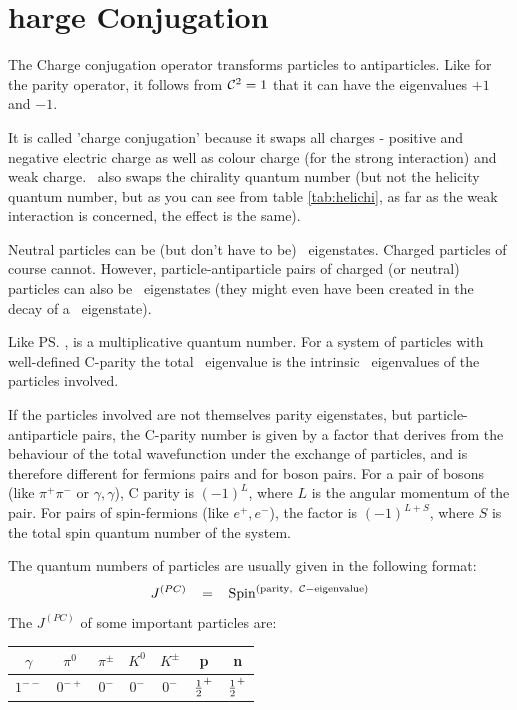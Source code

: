 \section{\cs{}harge Conjugation}
\label{sec:ChargeConjugation}
 The Charge conjugation operator transforms particles to
 antiparticles. Like for the parity operator, it follows from $\mathcal{C}^2=1$
 that it can have the eigenvalues $+1$ and $-1$.

 It is called 'charge conjugation' because it swaps all charges -
 positive and negative electric charge as well as colour charge (for
 the strong interaction) and weak charge. \cs\ also swaps the
 chirality quantum number (but not the helicity quantum number, but as
 you can see from table \ref{tab:helichi}, as far as the weak
 interaction is concerned, the effect is the same).

 Neutral particles can be (but don't have to be) \cs\
 eigenstates. Charged particles of course cannot. However,
 particle-antiparticle pairs of charged (or neutral) particles can
 also be \cs\ eigenstates (they might even have been created in the
 decay of a \cs\ eigenstate).

 Like \ps, \cs is a multiplicative quantum number. For a system of
 particles with well-defined C-parity the total \cs\ eigenvalue is the
 intrinsic \cs\ eigenvalues of the particles involved. 

 If the particles involved are not themselves parity eigenstates, but
 particle-antiparticle pairs, the C-parity number is given by a factor
 that derives from the behaviour of the total wavefunction under the
 exchange of particles, and is therefore different for fermions pairs
 and for boson pairs. For a pair of bosons (like $\pi^+\pi^-$ or
 $\gamma, \gamma$), C parity is $(-1)^{L}$, where $L$ is the angular
 momentum of the pair. For pairs of spin-\half fermions (like $e^+,
 e^-$), the factor is $(-1)^{L+S}$, where $S$ is the total spin
 quantum number of the system.

 The quantum numbers of particles are usually given in the following
 format:
\begin{equation}
%
  J^{(PC)} \;\;\;= \;\;\;\mbox{Spin}^{(\mathrm{parity,\;\; \cs-eigenvalue})}
%
\end{equation}
 The $J^{(PC)}$ of some important particles are:\\
\begin{tabular}{|*{7}{c|}}
\hline
 $\gamma$ & $\pi^0$ & $\pi^{\pm}$ & $K^0$   & $K^{\pm}$ & p & n
\\\hline
 $1^{--}$ & $0^{-+}$& $0^{-}$     & $0^{-}$ & $0^{-}$   & $\frac{1}{2}^{+}$
 & $\frac{1}{2}^{+}$
\\
\hline
\end{tabular}

